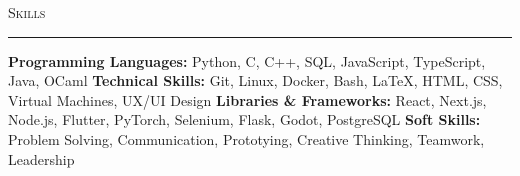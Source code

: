 \documentclass[11pt,letterpaper]{article}
\begin{document}
\vspace{4pt}
\textsc{\large{Skills}} 
\vspace{4pt}
\hrule
\begin{list}{}{\setlength{\leftmargin}{1em}\setlength{\rightmargin}{2pt}}
  
    \item
          \small{\textbf{Programming Languages:} Python, C, C++, SQL, JavaScript, TypeScript, Java, OCaml}
          \vspace{2pt} \newline
          \small{\textbf{Technical Skills:} Git, Linux, Docker, Bash, LaTeX, HTML, CSS, Virtual Machines, UX/UI Design}
          \vspace{2pt} \newline
          \small{\textbf{Libraries \& Frameworks:} React, Next.js, Node.js, Flutter, PyTorch, Selenium, Flask, Godot, PostgreSQL}
          \vspace{2pt} \newline
          \small{\textbf{Soft Skills:} Problem Solving, Communication, Prototying, Creative Thinking, Teamwork, Leadership}
          \vspace{0pt}
\end{list}
\end{document}
